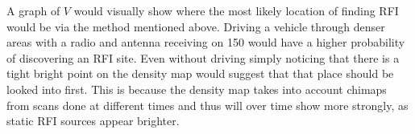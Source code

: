 \documentclass[a4paper,12pt]{article}
\begin{document}
                                                                                                                                                                                                                                                                                                                                                                                                                                                                                                                                                                                                                                                                                                                                                                                                                                                                                                                                                                                                                                                                                                                                                                                                                                                                                                                                                                                                                                                                                                                                                                                                                                                                                                                                                                                                                                                                                                                                                                                                   A graph of $V$ would visually show where the most likely location of finding RFI would be via the method mentioned above. Driving a vehicle through denser areas with a radio and antenna receiving on \unit{150}{\mega\hertz} would have a higher probability of discovering an RFI site. Even without driving simply noticing that there is a tight bright point on the density map would suggest that that place should be looked into first. This is because the density map takes into account chimaps from scans done at different times and thus will over time show more strongly, as static RFI sources appear brighter.
\end{document}
